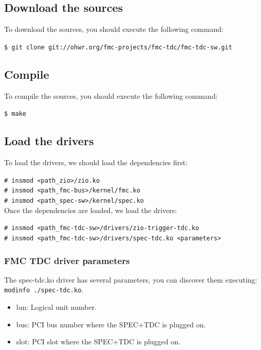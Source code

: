 \documentclass[a4paper,11pt]{article}
\begin{document}
\subsection{Download the sources}

To download the sources, you should execute the following command:

\indent\indent\texttt{\$ git clone git://ohwr.org/fmc-projects/fmc-tdc/fmc-tdc-sw.git}

\subsection{Compile}

To compile the sources, you should execute the following command:

\indent\indent\texttt{\$ make}

\subsection{Load the drivers}

To load the drivers, we should load the dependencies first:

\indent\indent\texttt{\# insmod <path\_zio>/zio.ko} \\
\indent\indent\texttt{\# insmod <path\_fmc-bus>/kernel/fmc.ko} \\
\indent\indent\texttt{\# insmod <path\_spec-sw>/kernel/spec.ko} \\
Once the dependencies are loaded, we load the drivers:

\indent\indent\texttt{\# insmod <path\_fmc-tdc-sw>/drivers/zio-trigger-tdc.ko} \\
\indent\indent\texttt{\# insmod <path\_fmc-tdc-sw>/drivers/spec-tdc.ko <parameters>} 

\subsubsection{FMC TDC driver parameters}

The spec-tdc.ko driver has several parameters, you can discover them executing: \texttt{modinfo ./spec-tdc.ko}.

\begin{itemize}
\item lun: Logical unit number.
\item bus: PCI bus number where the SPEC+TDC is plugged on.
\item slot: PCI slot where the SPEC+TDC is plugged on.
\end{itemize}
\end{document}
